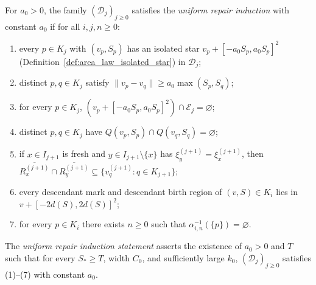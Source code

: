 \begin{definition}
    \label{def:area_law_uniform_repair_conclusion}
    \leanok
    For $a_0>0$, the family $(\mathcal D_j)_{j\ge0}$ satisfies the \emph{uniform repair induction}
    with constant $a_0$ if for all $i,j,n\ge0$:
    \begin{enumerate}
        \item every $p\in K_j$ with $(v_p,S_p)$ has an isolated star
              $v_p+[-a_0S_p,a_0S_p]^2$ (Definition~\ref{def:area_law_isolated_star}) in $\mathcal D_j$;
        \item distinct $p,q\in K_j$ satisfy $\lVert v_p-v_q\rVert\ge a_0\max(S_p,S_q)$;
        \item for every $p\in K_j$, $(v_p+[-a_0S_p,a_0S_p]^2)\cap\mathcal E_j=\varnothing$;
        \item distinct $p,q\in K_j$ have $Q(v_p,S_p)\cap Q(v_q,S_q)=\varnothing$;
        \item if $x\in I_{j+1}$ is fresh and $y\in I_{j+1}\setminus\{x\}$ has $\xi_y^{(j+1)}=\xi_x^{(j+1)}$,
              then $\overline{R_x^{(j+1)}}\cap\overline{R_y^{(j+1)}}\subseteq\{v_q^{(j+1)}:q\in K_{j+1}\}$;
        \item every descendant mark and descendant birth region of $(v,S)\in K_i$ lies in $v+[-2d(S),2d(S)]^2$;
        \item for every $p\in K_i$ there exists $n\ge0$ such that $\alpha_{i,n}^{-1}(\{p\})=\varnothing$.
    \end{enumerate}
    The \emph{uniform repair induction statement} asserts the existence of $a_0>0$ and $T$ such that
    for every $S_*\ge T$, width $C_0$, and sufficiently large $k_0$, $(\mathcal D_j)_{j\ge0}$
    satisfies (1)--(7) with constant $a_0$.
\end{definition}

